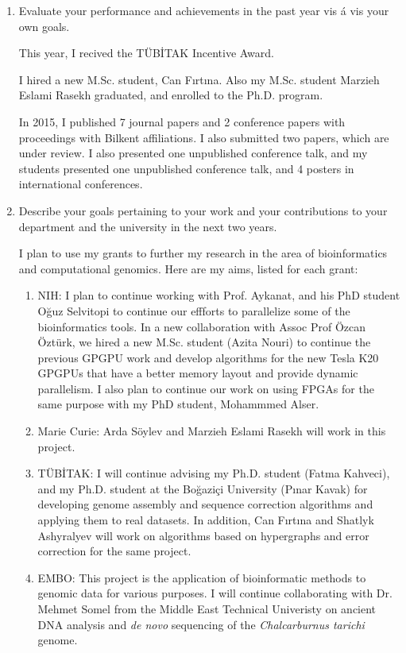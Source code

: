 \begin{enumerate}

\item Evaluate your performance and achievements in the past year vis á vis your own goals. 

This year, I recived the TÜBİTAK Incentive Award.

I hired a new M.Sc. student, Can Fırtına. Also my M.Sc. student Marzieh Eslami Rasekh graduated, and enrolled to the Ph.D. program.

In 2015, I published 7 journal papers and 2 conference papers with proceedings with Bilkent affiliations. I also submitted two papers, which are under review.
I also presented one unpublished conference talk, and my students presented one unpublished conference talk, and 4 posters in international conferences.


\item Describe your goals pertaining to your work and your contributions to your department and the university in the next two years. 

I plan to use my grants to further my research in the area of bioinformatics and computational genomics. Here are my aims, listed for each grant:

\begin{enumerate}

\item NIH: I plan to continue working with Prof. Aykanat, and his PhD student Oğuz Selvitopi to continue our effforts to parallelize some of the bioinformatics tools. In a new collaboration with Assoc Prof Özcan Öztürk, we hired a new M.Sc. student (Azita Nouri) to continue the previous GPGPU work and develop algorithms for the new Tesla K20 GPGPUs that have a better memory layout and provide dynamic parallelism.
I also plan to continue our work on using FPGAs for the same purpose with my PhD student, Mohammmed Alser.
\item Marie Curie: Arda Söylev and Marzieh Eslami Rasekh will work in this project.
\item TÜBİTAK: I will continue advising my Ph.D. student (Fatma Kahveci), and my Ph.D. student at the Boğaziçi University (Pınar Kavak) for developing genome assembly and sequence correction algorithms and applying them to real datasets. In addition, Can Fırtına and Shatlyk Ashyralyev will work on algorithms based on hypergraphs and error correction for the same project.
\item EMBO: This project is the application of bioinformatic methods to genomic data for various purposes. I will continue collaborating with Dr. Mehmet Somel from the Middle East Technical Univeristy
on ancient DNA analysis and {\it de novo} sequencing of the {\it Chalcarburnus tarichi} genome.

\end{enumerate}

\end{enumerate}

